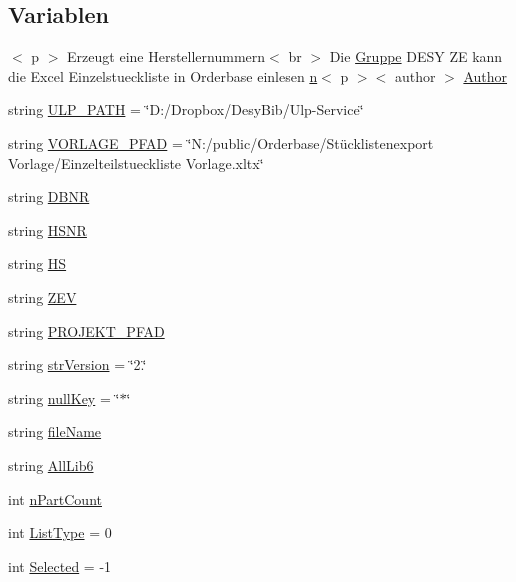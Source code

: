 \subsection*{Variablen}
\begin{DoxyCompactItemize}
\item 
$<$ p $>$ Erzeugt eine Herstellernummern$<$ br $>$ Die \hyperlink{_l_p-_daten_8ulp_a47d4dad2288e4e9d400c39dc34630b01}{Gruppe} D\+E\+S\+Y Z\+E kann die Excel Einzelstueckliste in Orderbase einlesen \hyperlink{read_database_8ulp_a76f11d9a0a47b94f72c2d0e77fb32240}{n}$<$ p $>$$<$ author $>$ \hyperlink{bom_8ulp_a7dac06bee1af56d0789d1cac5656a69a}{Author}
\item 
string \hyperlink{bom_8ulp_abf922ed4825a62eb9f0838b10265fc5b}{U\+L\+P\+\_\+\+P\+A\+T\+H} = \char`\"{}D\+:/Dropbox/Desy\+Bib/Ulp-\/Service\char`\"{}
\item 
string \hyperlink{bom_8ulp_a5b14b1eeb65e50d10a438760f173f2e9}{V\+O\+R\+L\+A\+G\+E\+\_\+\+P\+F\+A\+D} = \char`\"{}N\+:/public/Orderbase/Stücklistenexport Vorlage/Einzelteilstueckliste Vorlage.\+xltx\char`\"{}
\item 
string \hyperlink{bom_8ulp_a96dcbff778ab4d94b74cc4942d070162}{D\+B\+N\+R}
\item 
string \hyperlink{bom_8ulp_a61fcfd309e437276f500730e1bfa1074}{H\+S\+N\+R}
\item 
string \hyperlink{bom_8ulp_a76c4b2a7bb59b91514af25d07c1b8075}{H\+S}
\item 
string \hyperlink{bom_8ulp_a0722c36319aaa70ab8b91fc4743b1b99}{Z\+E\+V}
\item 
string \hyperlink{bom_8ulp_a646f3371d3767b31d185e665e471cd8c}{P\+R\+O\+J\+E\+K\+T\+\_\+\+P\+F\+A\+D}
\item 
string \hyperlink{bom_8ulp_a18a4ac3bd1cb918f565f779006ee77ba}{str\+Version} = \char`\"{}2.\char`\"{}
\item 
string \hyperlink{bom_8ulp_aaa6babfc550269768d017226e5515586}{null\+Key} = \char`\"{}$\ast$\char`\"{}
\item 
string \hyperlink{bom_8ulp_a71f006e8d6ac2a5d94354155a0da69f8}{file\+Name}
\item 
string \hyperlink{bom_8ulp_a50dee73f73f0902f6c035e550bf1ad3c}{All\+Lib6}
\item 
int \hyperlink{bom_8ulp_a52faf0e7daa8d9d1bbbf02e52c9ec521}{n\+Part\+Count}
\item 
int \hyperlink{bom_8ulp_ac4dbacd07ed6fd2299214fe82e75344f}{List\+Type} = 0
\item 
int \hyperlink{bom_8ulp_aa63c48313853c05d2e5b345772063942}{Selected} = -\/1
$$
\end{DoxyCompactItemize}
